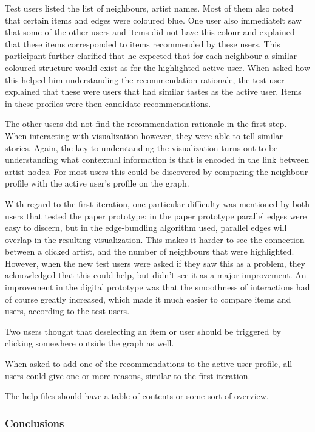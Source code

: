 Test users listed the list of neighbours, artist names. Most of them also noted that certain items and edges were coloured blue. One user also immediatelt saw that some of the other users and items did not have this colour and explained that these items corresponded to items recommended by these users. This participant further clarified that he expected that for each neighbour a similar coloured structure would exist as for the highlighted active user. When asked how this helped him understanding the recommendation rationale, the test user explained that these were users that had similar tastes as the active user. Items in these profiles were then candidate recommendations.

The other users did not find the recommendation rationale in the first step. When interacting with visualization however, they were able to tell similar stories. Again, the key to understanding the visualization turns out to be understanding what contextual information is that is encoded in the link between artist nodes. For most users this could be discovered by comparing the neighbour profile with the active user's profile on the graph.

With regard to the first iteration, one particular difficulty was mentioned by both users that tested the paper prototype: in the paper prototype parallel edges were easy to discern, but in the edge-bundling algorithm used, parallel edges will overlap in the resulting visualization. This makes it harder to see the connection between a clicked artist, and the number of neighbours that were highlighted. However, when the new test users were asked if they saw this as a problem, they acknowledged that this could help, but didn't see it as a major improvement. An improvement in the digital prototype was that the smoothness of interactions had of course greatly increased, which made it much easier to compare items and users, according to the test users.

Two users thought that deselecting an item or user should be triggered by clicking somewhere outside the graph as well.


When asked to add one of the recommendations to the active user profile, all users could give one or more reasons, similar to the first iteration.

The help files should have a table of contents or some sort of overview.


\subsubsection{Conclusions}\label{chapter:prototype:section:soundsuggest1:conclusion}

